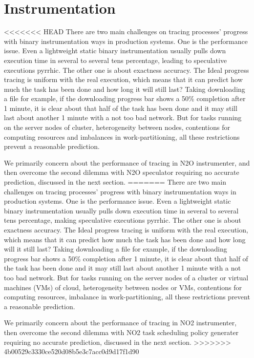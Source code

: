 \section{Instrumentation}

<<<<<<< HEAD
There are two main challenges on tracing processes’ progress with binary instrumentation ways in production systems. One is the performance issue. Even a lightweight static binary instrumentation usually pulls down execution time in several to several tens percentage, leading to speculative executions pyrrhic.  The other one is about exactness accuracy. The Ideal progress tracing is uniform with the real execution, which means that it can predict how much the task has been done and how long it will still last? Taking downloading a file for example, if the downloading progress bar shows a 50\% completion after 1 minute, it is clear about that half of the task has been done and it may still last about another 1 minute with a not too bad network. But for tasks running on the server nodes of cluster, heterogeneity between nodes, contentions for computing resources and imbalances in work-partitioning, all these restrictions prevent a reasonable prediction.

We primarily concern about the performance of tracing in N2O instrumenter, and then overcome the second dilemma with N2O speculator requiring no accurate prediction, discussed in the next section.
=======
There are two main challenges on tracing processes’ progress with binary instrumentation ways in production systems. One is the performance issue. Even a lightweight static binary instrumentation usually pulls down execution time in several to several tens percentage, making speculative executions pyrrhic.  The other one is about exactness accuracy. The Ideal progress tracing is uniform with the real execution, which means that it can predict how much the task has been done and how long will it still last? Taking downloading a file for example, if the downloading progress bar shows a 50\% completion after 1 minute, it is clear about that half of the task has been done and it may still last about another 1 minute with a not too bad network. But for tasks running on the server nodes of a cluster or virtual machines (VMs) of cloud, heterogeneity between nodes or VMs, contentions for computing resources, imbalance in work-partitioning, all these restrictions prevent a reasonable prediction.

We primarily concern about the performance of tracing in NO2 instrumenter, then overcome the second dilemma with NO2 task scheduling policy generater requiring no accurate prediction, discussed in the next section.
>>>>>>> 4b00529c3330ce520d08b5e3c7acc0d9d17f1d90

